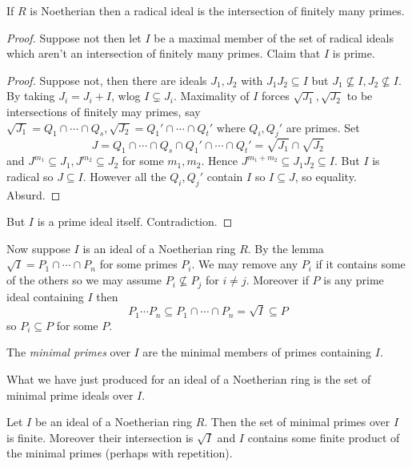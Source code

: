 \documentclass[a4paper]{article}
\begin{document}
\begin{lemma}
  If \(R\) is Noetherian then a radical ideal is the intersection of finitely many primes.
\end{lemma}

\begin{proof}
  Suppose not then let \(I\) be a maximal member of the set of radical ideals which aren't an intersection of finitely many primes. Claim that \(I\) is prime.
  \begin{proof}
    Suppose not, then there are ideals \(J_1, J_2\) with \(J_1J_2 \subseteq I\) but \(J_1 \nsubseteq I, J_2 \nsubseteq I\). By taking \(J_i = J_i + I\), wlog \(I \subsetneq J_i\). Maximality of \(I\) forces \(\sqrt{J_1}, \sqrt{J_2}\) to be intersections of finitely may primes, say \(\sqrt{J_1} = Q_1 \cap \cdots \cap Q_s, \sqrt{J_2} = Q_1' \cap \cdots \cap Q_t'\) where \(Q_i, Q_j'\) are primes. Set
    \[
      J = Q_1 \cap \cdots \cap Q_s \cap Q_1' \cap \cdots \cap Q_t' = \sqrt{J_1} \cap \sqrt{J_2}
    \]
    and \(J^{m_1} \subseteq J_1, J^{m_2} \subseteq J_2\) for some \(m_1, m_2\). Hence \(J^{m_1 + m_2} \subseteq J_1J_2 \subseteq I\). But \(I\) is radical so \(J \subseteq I\). However all the \(Q_i, Q_j'\) contain \(I\) so \(I \subseteq J\), so equality. Absurd.
  \end{proof}

  But \(I\) is a prime ideal itself. Contradiction.
\end{proof}

Now suppose \(I\) is an ideal of a Noetherian ring \(R\). By the lemma \(\sqrt I = P_1 \cap \cdots \cap P_n\) for some primes \(P_i\). We may remove any \(P_i\) if it contains some of the others so we may assume \(P_i \nsubseteq P_j\) for \(i \neq j\). Moreover if \(P\) is any prime ideal containing \(I\) then
\[
  P_1 \cdots P_n \subseteq P_1 \cap \cdots \cap P_n = \sqrt I \subseteq P
\]
so \(P_i \subseteq P\) for some \(P\).

\begin{definition}
  The \emph{minimal primes} over \(I\) are the minimal members of primes containing \(I\).
\end{definition}

What we have just produced for an ideal of a Noetherian ring is the set of minimal prime ideals over \(I\).

\begin{lemma}
  Let \(I\) be an ideal of a Noetherian ring \(R\). Then the set of minimal primes over \(I\) is finite. Moreover their intersection is \(\sqrt I\) and \(I\) contains some finite product of the minimal primes (perhaps with repetition).
\end{lemma}
\end{document}
